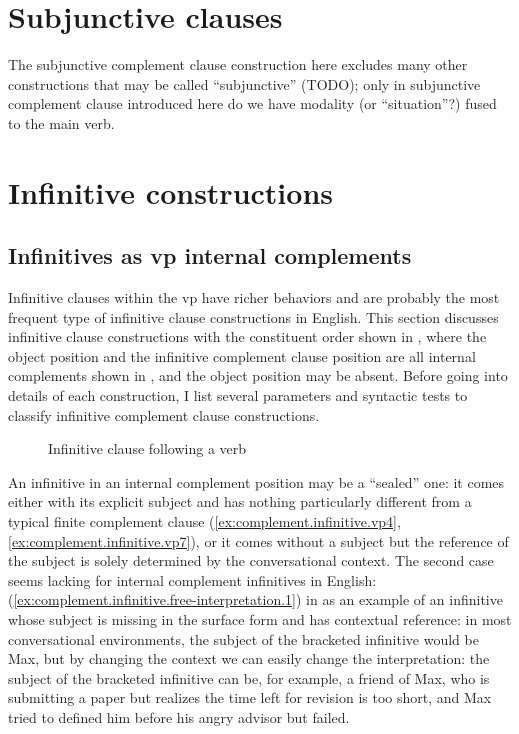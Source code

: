 \documentclass[UTF8, a4paper, oneside, scheme=plain, 12pt]{ctexbook}
\newcommand*{\citepage}[1]{p.~{#1}}
\begin{document}
\section{Subjunctive clauses}\label{sec:complement.subjunctive}

The subjunctive complement clause construction here 
excludes many other constructions that may be called ``subjunctive'' (TODO);
only in subjunctive complement clause introduced here 
do we have modality (or ``situation''?) fused to the main verb.

\section{Infinitive constructions}

\subsection{Infinitives as \acs{vp} internal complements}

Infinitive clauses within the \acs{vp} have richer behaviors and are probably the most frequent type of infinitive clause constructions in English.
This section discusses infinitive clause constructions with the constituent order 
shown in ,
where the object position and the infinitive complement clause position 
are all internal complements shown in ,
and the object position may be absent.
Before going into details of each construction,
I list several parameters and syntactic tests 
to classify infinitive complement clause constructions.

\begin{figure}[H]
    \centering
    {\small }
    \caption{Infinitive clause following a verb}
    \label{fig:complement.infinitive.template}
\end{figure}


An infinitive in an internal complement position may be a ``sealed'' one: 
it comes either with its explicit subject 
and has nothing particularly different from a typical finite complement clause
(\ref{ex:complement.infinitive.vp4}, \ref{ex:complement.infinitive.vp7}), 
or it comes without a subject but the reference of the subject is solely determined by the conversational context.
The second case seems lacking for internal complement infinitives in English: 
(\ref{ex:complement.infinitive.free-interpretation.1}) in \citet[\citepage{1269}]{cgel}
as an example of an infinitive whose subject is missing in the surface form 
and has contextual reference: 
in most conversational environments, the subject of the bracketed infinitive would be Max, 
but by changing the context we can easily change the interpretation: 
the subject of the bracketed infinitive can be, for example, 
a friend of Max, who is submitting a paper but realizes the time left for revision is too short, 
and Max tried to defined him before his angry advisor but failed.
\end{document}
